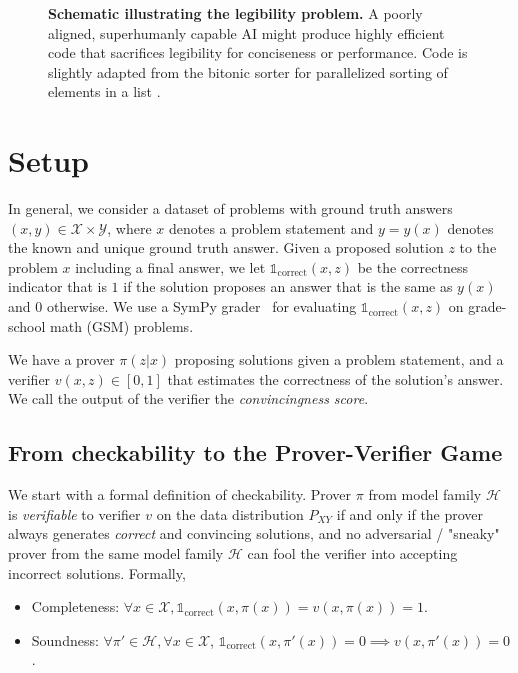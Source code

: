 \documentclass{article}
\newcommand{\indcor}[1]{\mathds{1}_{\text{correct}}\left({#1}\right)}
\begin{document}
\begin{figure}
    \centering
    \caption{\textbf{Schematic illustrating the legibility problem.} A poorly aligned, superhumanly capable AI might produce highly efficient code that sacrifices legibility for conciseness or performance. Code is slightly adapted from the bitonic sorter for parallelized sorting of elements in a list \citep{enwiki:1179848735}. }
    \label{fig:comic}
\end{figure}

\section{Setup}\label{sec:Setup}


In general, we consider a dataset of problems with ground truth answers $(x,y)\in \mathcal{X}\times \mathcal{Y}$, where $x$ denotes a problem statement and $y=y(x)$ denotes the known and unique ground truth answer. Given a proposed solution $z$ to the problem $x$ including a final answer, we let $\indcor{x, z}$ be the correctness indicator that is $1$ if the solution proposes an answer that is the same as $y(x)$ and $0$ otherwise. We use a SymPy grader~\citep{sympy} for evaluating $\indcor{x, z}$ on grade-school math (GSM) problems.

We have a prover $\pi(z|x)$ proposing solutions given a problem statement, and a verifier $v(x, z) \in [0, 1]$ that estimates the correctness of the solution's answer. We call the output of the verifier the \emph{convincingness score}. 

\subsection{From checkability to the Prover-Verifier Game}

We start with a formal definition of checkability. Prover $\pi$ from model family $\mathcal{H}$ is \emph{verifiable} to verifier $v$ on the data distribution $P_{XY}$ if and only if the prover always generates \emph{correct} and convincing solutions, and no adversarial / "sneaky" prover from the same model family $\mathcal{H}$ can fool the verifier into accepting incorrect solutions. Formally,
\begin{itemize}
    \item Completeness: 
    $\forall x \in \mathcal{X}, \indcor{x, \pi(x)}=v(x, \pi(x))=1$.
    \item Soundness: $\forall \pi' \in \mathcal{H}, \forall x \in \mathcal{X}$, $\indcor{x, \pi'(x)}=0 \implies v(x, \pi'(x))=0$.
\end{itemize}
\end{document}
